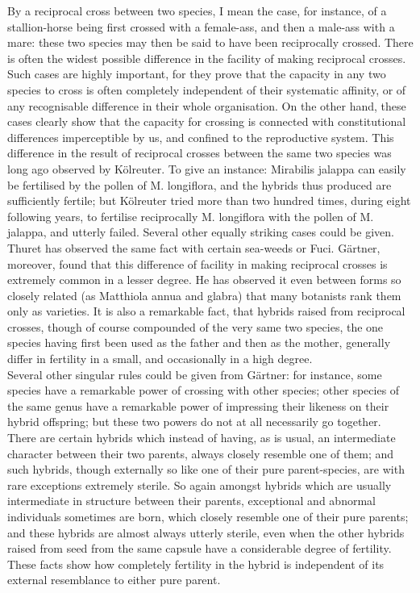 \indent By a reciprocal cross between two species, I mean the case, for instance, of a stallion-horse being first crossed with a female-ass, and then a male-ass with a mare: these two species may then be said to have been reciprocally crossed. There is often the widest possible difference in the facility of making reciprocal crosses. Such cases are highly important, for they prove that the capacity in any two species to cross is often completely independent of their systematic affinity, or of any recognisable difference in their whole organisation. On the other hand, these cases clearly show that the capacity for crossing is connected with constitutional differences imperceptible by us, and confined to the reproductive system. This difference in the result of reciprocal crosses between the same two species was long ago observed by K\"{o}lreuter. To give an instance: Mirabilis jalappa can easily be fertilised by the pollen of M. longiflora, and the hybrids thus produced are sufficiently fertile; but K\"{o}lreuter tried more than two hundred times, during eight following years, to fertilise reciprocally M. longiflora with the pollen of M. jalappa, and utterly failed. Several other equally striking cases could be given. Thuret has observed the same fact with certain sea-weeds or Fuci. G\"{a}rtner, moreover, found that this difference of facility in making reciprocal crosses is extremely common in a lesser degree. He has observed it even between forms so closely related (as Matthiola annua and glabra) that many botanists rank them only as varieties. It is also a remarkable fact, that hybrids raised from reciprocal crosses, though of course compounded of the very same two species, the one species having first been used as the father and then as the mother, generally differ in fertility in a small, and occasionally in a high degree.\\
\indent Several other singular rules could be given from G\"{a}rtner: for instance, some species have a remarkable power of crossing with other species; other species of the same genus have a remarkable power of impressing their likeness on their hybrid offspring; but these two powers do not at all necessarily go together. There are certain hybrids which instead of having, as is usual, an intermediate character between their two parents, always closely resemble one of them; and such hybrids, though externally so like one of their pure parent-species, are with rare exceptions extremely sterile. So again amongst hybrids which are usually intermediate in structure between their parents, exceptional and abnormal individuals sometimes are born, which closely resemble one of their pure parents; and these hybrids are almost always utterly sterile, even when the other hybrids raised from seed from the same capsule have a considerable degree of fertility. These facts show how completely fertility in the hybrid is independent of its external resemblance to either pure parent.\\
